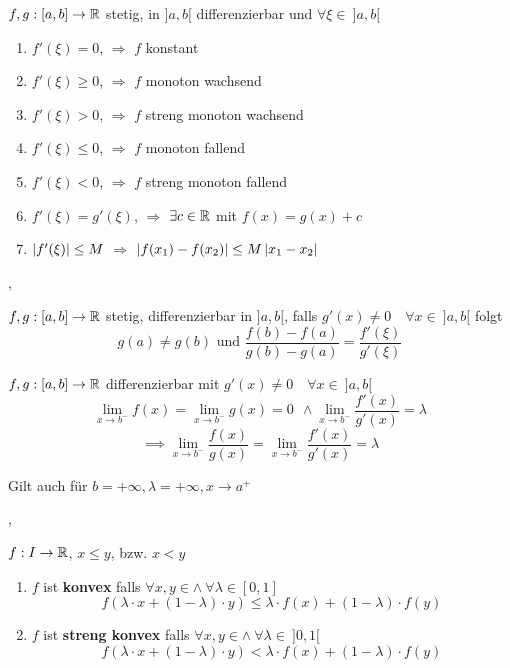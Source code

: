 \Korollar[4.2.5] $f, g :[a,b] \rightarrow \mathbb{R}$ stetig, in $]a, b[$ differenzierbar und $\forall \xi \in \ ]a, b[$
\begin{enumerate}
\item $f'(\xi) = 0 $, $\Rightarrow$ $f$ konstant 
\item $f'(\xi) \geq 0$, $\Rightarrow$ $f$ monoton wachsend
\item $f'(\xi) > 0$, $\Rightarrow$ $f$ streng monoton wachsend
\item $f'(\xi) \leq 0$, $\Rightarrow$ $f$ monoton fallend
\item $f'(\xi) < 0$, $\Rightarrow$ $f$ streng monoton fallend
\item $f'(\xi) = g'(\xi)$, $\Rightarrow$ $ \exists c \in \mathbb{R}$ mit $f(x) = g(x) + c$
\item $\left\lvert f'(\xi) \right\rvert \leq M$ $\Rightarrow$ $\left\lvert f(x_1) - f(x_2) \right\rvert \leq M \left\lvert x_1 - x_2 \right\rvert$
\end{enumerate}

\sep

\Satz[4.2.9] $f, g : [a,b] \rightarrow \mathbb{R}$ stetig, differenzierbar in $]a, b[$, falls $g'(x) \neq 0 \quad \forall x \in \ ]a, b[$  folgt 
\[g(a) \neq g(b) \text{ und } \frac{f(b) - f(a)}{g(b) - g(a)} = \frac{f'(\xi)}{g'(\xi)}\]

\Satz[4.2.10 l'Hospital] $f, g : [a, b] \rightarrow \mathbb{R}$ differenzierbar mit $g'(x) \neq 0 \quad \forall x \in \ ]a, b[$ 
\[ \lim\limits_{x \rightarrow b^-} f(x) =  \lim\limits_{x \rightarrow b^-} g(x) = 0 \ \ \land \lim\limits_{x \rightarrow b^-} \frac{f'(x)}{g'(x)} = \lambda \] 
\[ \implies \lim\limits_{x \rightarrow b^-} \frac{f(x)}{g(x)} = \lim\limits_{x \rightarrow b^-} \frac{f'(x)}{g'(x)}  = \lambda \]

\Bem Gilt auch für $b = +\infty, \lambda = + \infty, x \rightarrow a^+$

\sep

\Def[4.2.13] $f : I \rightarrow \mathbb{R}$, $x \leq y$, bzw. $x < y$
\begin{enumerate}
\item $f$ ist \textbf{konvex} falls $\forall x,y \in \land \ \forall \lambda \in [0,1] $
\[ f(\lambda \cdot x + (1 - \lambda) \cdot y) \leq \lambda \cdot f(x) + (1 - \lambda) \cdot f(y) \]

\item $f$ ist \textbf{streng konvex} falls $\forall x,y \in \land \ \forall \lambda \in  \ ]0,1[ $
\[ f(\lambda \cdot x + (1 - \lambda) \cdot y) < \lambda \cdot f(x) + (1 - \lambda) \cdot f(y) \]
\end{enumerate}

